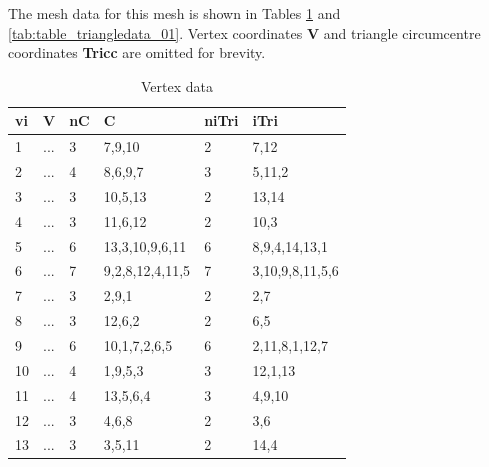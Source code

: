 \documentclass{article}
\begin{document}
The mesh data for this mesh is shown in Tables \ref{tab:table_vertexdata_01} and \ref{tab:table_triangledata_01}. Vertex coordinates \textbf{V} and triangle circumcentre coordinates \textbf{Tricc} are omitted for brevity.

\begin{table}[H] \label{tab:table_vertexdata_01}
  \begin{center}
    \caption{Vertex data}
    \begin{tabular}{l|l|l|l|l|l}
      \textbf{vi} & \textbf{V} & \textbf{nC} & \textbf{C} & \textbf{niTri} & \textbf{iTri}\\
      \hline
      1 & ... & 3 & 7,9,10 & 2 & 7,12\\
      2 & ... & 4 & 8,6,9,7 & 3 & 5,11,2\\
      3 & ... & 3 & 10,5,13 & 2 & 13,14\\
      4 & ... & 3 & 11,6,12 & 2 & 10,3\\
      5 & ... & 6 & 13,3,10,9,6,11 & 6 & 8,9,4,14,13,1\\
      6 & ... & 7 & 9,2,8,12,4,11,5 & 7 & 3,10,9,8,11,5,6\\
      7 & ... & 3 & 2,9,1 & 2 & 2,7\\
      8 & ... & 3 & 12,6,2 & 2 & 6,5\\
      9 & ... & 6 & 10,1,7,2,6,5 & 6 & 2,11,8,1,12,7\\
      10 & ... & 4 & 1,9,5,3 & 3 & 12,1,13\\
      11 & ... & 4 & 13,5,6,4 & 3 & 4,9,10\\
      12 & ... & 3 & 4,6,8 & 2 & 3,6\\
      13 & ... & 3 & 3,5,11 & 2 & 14,4\\
    \end{tabular}
  \end{center}
\end{table}
\end{document}
